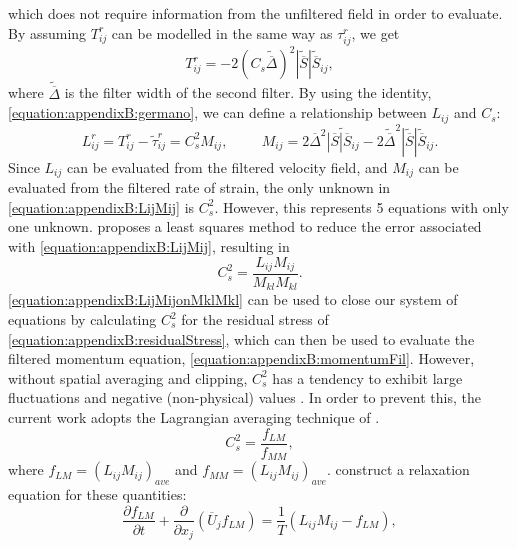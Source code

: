 \documentclass[12pt,oneside,a4paper]{article}
\newcommand{\pdev}[2]{\frac{\partial {#1}}{\partial {#2}}}
\begin{document}
which does not require information from the unfiltered field in order to evaluate. By assuming $T_{ij}^r$ can be modelled in the same way as $\tau_{ij}^r$, we get
\begin{equation}
T_{ij}^r = - 2 (C_s \widetilde{\overline{\Delta}})^2 |\widetilde{\overline{S}}| \widetilde{\overline{S}}_{ij},
\end{equation}
where $\widetilde{\overline{\Delta}}$ is the filter width of the second filter.
By using the \cite{germano1991} identity, \eqref{equation:appendixB:germano}, we can define a relationship between $L_{ij}$ and $C_s$:
\begin{equation}
\label{equation:appendixB:LijMij}
L_{ij}^r = T_{ij}^r - \widetilde{\tau}_{ij}^r =  C_s^2 M_{ij}, \hspace{1cm} M_{ij} = 2 \overline{\Delta}^2 \widetilde{|\overline{S}|\overline{S}_{ij}} - 2 \widetilde{\overline{\Delta}}^2 |\widetilde{\overline{S}}|\widetilde{\overline{S}}_{ij}.
\end{equation}
Since $L_{ij}$ can be evaluated from the filtered velocity field, and $M_{ij}$ can be evaluated from the filtered rate of strain, the only unknown in \eqref{equation:appendixB:LijMij} is $C_s^2$. However, this represents 5 equations with only one unknown. \cite{lilly1992} proposes a least squares method to reduce the error associated with \eqref{equation:appendixB:LijMij}, resulting in 
\begin{equation}
\label{equation:appendixB:LijMijonMklMkl}
C_s^2 = \frac{L_{ij}M_{ij}}{M_{kl}M_{kl}}.
\end{equation}
\eqref{equation:appendixB:LijMijonMklMkl} can be used to close our system of equations by calculating $C_s^2$ for the residual stress of \eqref{equation:appendixB:residualStress}, which can then be used to evaluate the filtered momentum equation, \eqref{equation:appendixB:momentumFil}. However, without spatial averaging and clipping, $C_s^2$ has a tendency to exhibit large fluctuations and negative (non-physical) values \citep{pope2001}. In order to prevent this, the current work adopts the Lagrangian averaging technique of \cite{meneveau1996}.
\begin{equation}
\label{equation:appendixB:Cs2_flmfmm}
C_s^2 = \frac{f_{LM}}{f_{MM}},
\end{equation}
where $f_{LM}= (L_{ij}M_{ij})_{ave}$ and $f_{MM} = (L_{ij}M_{ij})_{ave}$. \cite{meneveau1996} construct a relaxation equation for these quantities:
\begin{equation}
\label{equation:appendixB:flmTransport}
\pdev{f_{LM}}{t} + \pdev{}{x_j}(\overline{U}_j f_{LM}) = \frac{1}{T}(L_{ij}M_{ij} - f_{LM}),
\end{equation}
\end{document}
